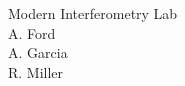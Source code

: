 \begin{titlepage}

\centering

\Huge Modern Interferometry Lab \\[.5cm]

\large A. Ford \\ A. Garcia \\ R. Miller 

\date{\today}


\end{titlepage}